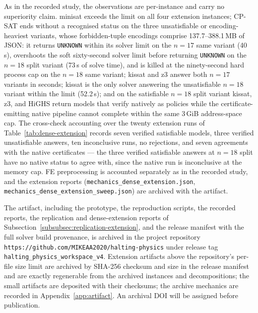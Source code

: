 \documentclass[11pt]{article}
\theoremstyle{plain}
\theoremstyle{definition}
\theoremstyle{remark}
\begin{document}
As in the recorded study, the observations are per-instance and carry no
superiority claim.  minisat exceeds the limit on all four extension instances; CP-SAT ends
without a recognised status on the three unsatisfiable or encoding-heaviest
variants, whose forbidden-tuple encodings comprise 137.7--388.1\,MB of JSON:
it returns \texttt{UNKNOWN} within its solver limit on the \(n{=}17\) same
variant (40\,s), overshoots the soft sixty-second solver limit before
returning \texttt{UNKNOWN} on the \(n{=}18\) split variant (73\,s of solve
time), and is killed at the ninety-second hard process cap on the
\(n{=}18\) same variant;
kissat and z3 answer both \(n{=}17\) variants in seconds; kissat is the
only solver answering the unsatisfiable \(n{=}18\) variant within the limit
(52.2\,s); and on the satisfiable \(n{=}18\) split variant kissat, z3, and
HiGHS return models that verify natively as policies while the
certificate-emitting native pipeline cannot complete within the same
3\,GiB address-space cap.  The cross-check accounting over the twenty
extension runs of Table~\ref{tab:dense-extension} records seven verified
satisfiable models, three verified unsatisfiable answers, ten inconclusive
runs, no rejections, and seven
agreements with the native certificates --- the three verified
satisfiable answers at \(n{=}18\) split have no native status to agree
with, since the native run is inconclusive at the memory cap.  FE
preprocessing is accounted separately as in the recorded study, and the
extension reports
(\texttt{mechanics\_dense\_extension.json}, \\
\texttt{mechanics\_dense\_extension\_sweep.json}) are archived with the
artifact.

The artifact, including the prototype, the reproduction scripts, the recorded
reports, the replication and dense-extension reports of
Subsection~\ref{subsubsec:replication-extension}, and the release manifest
with the full solver build provenance, is archived in the project repository
\texttt{https://github.com/\allowbreak MIKEAA2020/\allowbreak halting-physics}
under release tag
\texttt{halting\_\allowbreak physics\_\allowbreak workspace\_\allowbreak v4}.  Extension
artifacts above the repository's per-file size limit are archived by SHA-256
checksum and size in the release manifest and are exactly regenerable from
the archived instances and decompositions; the small artifacts are deposited
with their checksums; the archive mechanics are recorded in
Appendix~\ref{app:artifact}.  An archival DOI will be assigned before
publication.
\end{document}
